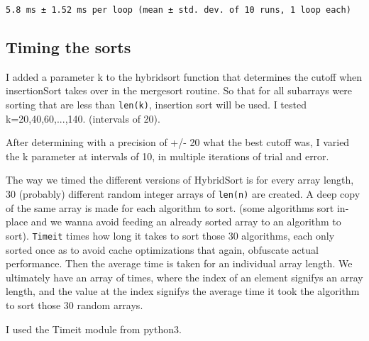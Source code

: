 \documentclass[11pt]{article}
\begin{document}
    \begin{Verbatim}[commandchars=\\\{\}]
5.8 ms ± 1.52 ms per loop (mean ± std. dev. of 10 runs, 1 loop each)

    \end{Verbatim}

    \subsection{Timing the sorts}\label{timing-the-sorts}

I added a parameter k to the hybridsort function that determines the
cutoff when insertionSort takes over in the mergesort routine. So that
for all subarrays were sorting that are less than \texttt{len(k)},
insertion sort will be used. I tested k=20,40,60,...,140. (intervals of
20).

After determining with a precision of +/- 20 what the best cutoff was, I
varied the k parameter at intervals of 10, in multiple iterations of
trial and error.

The way we timed the different versions of HybridSort is for every array
length, 30 (probably) different random integer arrays of \texttt{len(n)}
are created. A deep copy of the same array is made for each algorithm to
sort. (some algorithms sort in-place and we wanna avoid feeding an
already sorted array to an algorithm to sort). \texttt{Timeit} times how
long it takes to sort those 30 algorithms, each only sorted once as to
avoid cache optimizations that again, obfuscate actual performance. Then
the average time is taken for an individual array length. We ultimately
have an array of times, where the index of an element signifys an array
length, and the value at the index signifys the average time it took the
algorithm to sort those 30 random arrays.

I used the Timeit module from python3.
\end{document}
